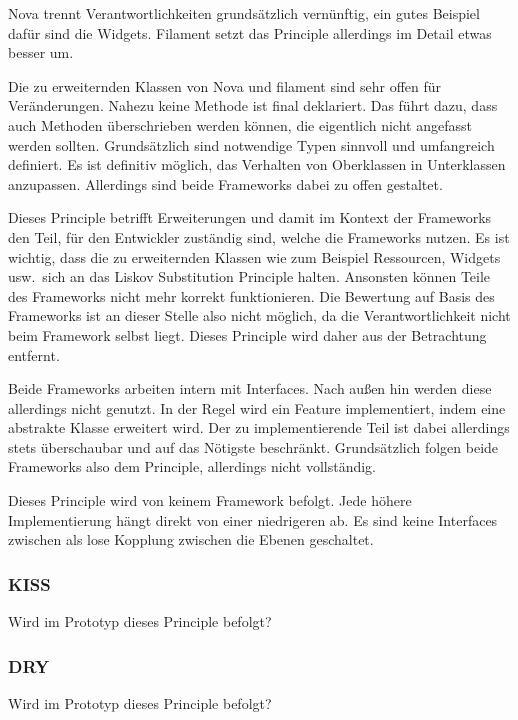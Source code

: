 Nova trennt Verantwortlichkeiten grundsätzlich vernünftig, ein gutes Beispiel dafür sind die Widgets.
Filament setzt das Principle allerdings im Detail etwas besser um.

Die zu erweiternden Klassen von Nova und filament sind sehr offen für Veränderungen.
Nahezu keine Methode ist final deklariert.
Das führt dazu, dass auch Methoden überschrieben werden können, die eigentlich nicht angefasst werden sollten.
Grundsätzlich sind notwendige Typen sinnvoll und umfangreich definiert.
Es ist definitiv möglich, das Verhalten von Oberklassen in Unterklassen anzupassen.
Allerdings sind beide Frameworks dabei zu offen gestaltet.

Dieses Principle betrifft Erweiterungen und damit im Kontext der Frameworks den Teil, für den Entwickler zuständig sind, welche die Frameworks nutzen.
Es ist wichtig, dass die zu erweiternden Klassen wie zum Beispiel Ressourcen, Widgets usw.\ sich an das Liskov Substitution Principle halten.
Ansonsten können Teile des Frameworks nicht mehr korrekt funktionieren.
Die Bewertung auf Basis des Frameworks ist an dieser Stelle also nicht möglich, da die Verantwortlichkeit nicht beim Framework selbst liegt.
Dieses Principle wird daher aus der Betrachtung entfernt.

Beide Frameworks arbeiten intern mit Interfaces.
Nach außen hin werden diese allerdings nicht genutzt.
In der Regel wird ein Feature implementiert, indem eine abstrakte Klasse erweitert wird.
Der zu implementierende Teil ist dabei allerdings stets überschaubar und auf das Nötigste beschränkt.
Grundsätzlich folgen beide Frameworks also dem Principle, allerdings nicht vollständig.

Dieses Principle wird von keinem Framework befolgt.
Jede höhere Implementierung hängt direkt von einer niedrigeren ab.
Es sind keine Interfaces zwischen als lose Kopplung zwischen die Ebenen geschaltet.

\color{red}
\subsubsection{KISS}
Wird im Prototyp dieses Principle befolgt?

\subsubsection{DRY}
Wird im Prototyp dieses Principle befolgt?

